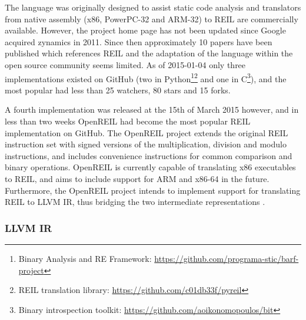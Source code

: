 

The language was originally designed to assist static code analysis and translators from native assembly (x86, PowerPC-32 and ARM-32) to REIL are commercially available. However, the project home page has not been updated since Google acquired zynamics in 2011. Since then approximately 10 papers have been published which references REIL and the adaptation of the language within the open source community seems limited. As of 2015-01-04 only three implementations existed on GitHub (two in Python\footnote{Binary Analysis and RE Framework: \url{https://github.com/programa-stic/barf-project}}\footnote{REIL translation library: \url{https://github.com/c01db33f/pyreil}} and one in C\footnote{Binary introspection toolkit: \url{https://github.com/aoikonomopoulos/bit}}), and the most popular had less than 25 watchers, 80 stars and 15 forks.

A fourth implementation was released at the 15th of March 2015 however, and in less than two weeks OpenREIL had become the most popular REIL implementation on GitHub. The OpenREIL project extends the original REIL instruction set with signed versions of the multiplication, division and modulo instructions, and includes convenience instructions for common comparison and binary operations. OpenREIL is currently capable of translating x86 executables to REIL, and aims to include support for ARM and x86-64 in the future. Furthermore, the OpenREIL project intends to implement support for translating REIL to LLVM IR, thus bridging the two intermediate representations \cite{openreil}.


\subsubsection{LLVM IR}



